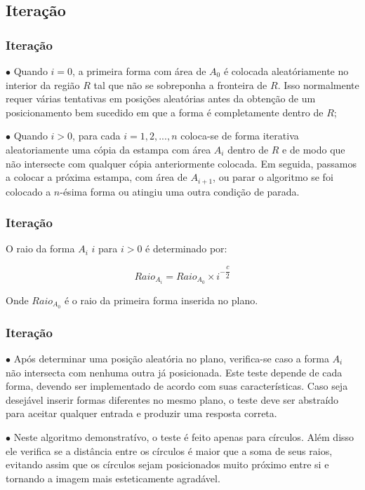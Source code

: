\documentclass[aspectratio=169]{beamer}
\begin{document}
\subsection{Iteração}
\begin{frame}
\frametitle{Iteração}

$\bullet$ Quando $i = 0$, a primeira forma com área de $A_{0}$ é colocada aleatóriamente no interior da região $R$ tal que não se sobreponha a fronteira de $R$. Isso normalmente requer várias tentativas em posições aleatórias antes da obtenção de um posicionamento bem sucedido em que a forma é completamente dentro de $R$;
\medskip
\pause

$\bullet$ Quando $i > 0$, para cada $i = 1, 2, ..., n$ coloca-se de forma iterativa aleatoriamente uma cópia da estampa com área $A_{i}$ dentro de $R$ e de modo que não intersecte com qualquer cópia anteriormente colocada. Em seguida, passamos a colocar a próxima estampa, com área de $A_{i + 1}$, ou parar o algoritmo se foi colocado a $n$-ésima forma ou atingiu uma outra condição de parada.
\medskip

\end{frame}

\begin{frame}
\frametitle{Iteração}

O raio da forma $A_{i}$ $i$ para $i > 0$ é determinado por:
\medskip

\begin{equation}
Raio_{A_{i}}= Raio_{A_{0}} \times i^{-\dfrac{c}{2}} 
\end{equation}
\medskip

Onde $Raio_{A_{0}}$ é o raio da primeira forma inserida no plano.
\medskip

\end{frame}

\begin{frame}
\frametitle{Iteração}

$\bullet$ Após determinar uma posição aleatória no plano, verifica-se caso a forma $A_{i}$ não intersecta com nenhuma outra já posicionada. Este teste depende de cada forma, devendo ser implementado de acordo com suas características. Caso seja desejável inserir formas diferentes no mesmo plano, o teste deve ser abstraído para aceitar qualquer entrada e produzir uma resposta correta.
\medskip
\pause

$\bullet$ Neste algoritmo demonstratívo, o teste é feito apenas para círculos. Além disso ele verifica se a distância entre os círculos é maior que a soma de seus raios, evitando assim que os círculos sejam posicionados muito próximo entre si e tornando a imagem mais esteticamente agradável.
\medskip

\end{frame}
\end{document}
